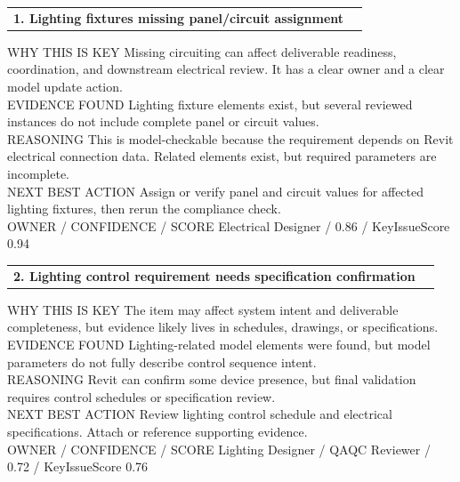 \documentclass[10pt,letterpaper]{article}
\newcommand{\smalllabel}[1]{{\scriptsize\textcolor{emaMuted}{\MakeUppercase{#1}}}}
\newcommand{\badge}[3]{\tcbox[on line,colback=#2,colframe=#2,boxrule=0pt,arc=2mm,left=5pt,right=5pt,top=2pt,bottom=2pt]{\scriptsize\textbf{\textcolor{#3}{#1}}}}
\newcommand{\notmetbadge}{\badge{Not Met}{emaRedBg}{emaRed}}
\newcommand{\reviewbadge}{\badge{Needs Human Review}{emaAmberBg}{emaAmber}}
\begin{document}
\begin{tcolorbox}[colback=white,colframe=emaRedBg,boxrule=0.9pt,borderline west={3pt}{0pt}{emaRed}]
\begin{tabularx}{\textwidth}{X r}
{\large\bfseries\textcolor{emaNavy}{1. Lighting fixtures missing panel/circuit assignment}} & \notmetbadge \\
\end{tabularx}
\smalllabel{Why this is key} Missing circuiting can affect deliverable readiness, coordination, and downstream electrical review. It has a clear owner and a clear model update action.\\[3pt]
\smalllabel{Evidence found} Lighting fixture elements exist, but several reviewed instances do not include complete panel or circuit values.\\[3pt]
\smalllabel{Reasoning} This is model-checkable because the requirement depends on Revit electrical connection data. Related elements exist, but required parameters are incomplete.\\[3pt]
\smalllabel{Next Best Action} Assign or verify panel and circuit values for affected lighting fixtures, then rerun the compliance check.\\[3pt]
\smalllabel{Owner / Confidence / Score} Electrical Designer / 0.86 / KeyIssueScore 0.94
\end{tcolorbox}

\begin{tcolorbox}[colback=white,colframe=emaAmberBg,boxrule=0.9pt,borderline west={3pt}{0pt}{emaAmber}]
\begin{tabularx}{\textwidth}{X r}
{\large\bfseries\textcolor{emaNavy}{2. Lighting control requirement needs specification confirmation}} & \reviewbadge \\
\end{tabularx}
\smalllabel{Why this is key} The item may affect system intent and deliverable completeness, but evidence likely lives in schedules, drawings, or specifications.\\[3pt]
\smalllabel{Evidence found} Lighting-related model elements were found, but model parameters do not fully describe control sequence intent.\\[3pt]
\smalllabel{Reasoning} Revit can confirm some device presence, but final validation requires control schedules or specification review.\\[3pt]
\smalllabel{Next Best Action} Review lighting control schedule and electrical specifications. Attach or reference supporting evidence.\\[3pt]
\smalllabel{Owner / Confidence / Score} Lighting Designer / QAQC Reviewer / 0.72 / KeyIssueScore 0.76
\end{tcolorbox}
\end{document}
